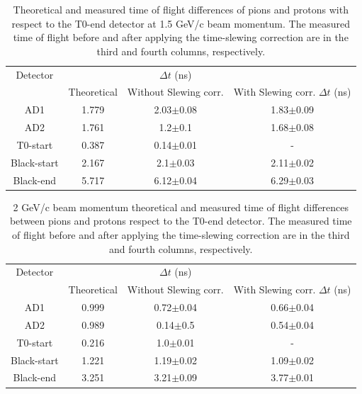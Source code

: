 	\begin{table}[h!]
		\centering
		\caption{
		Theoretical and measured time of flight differences of pions and protons with respect
			to the T0-end detector at 1.5 GeV/c beam momentum. %
			The measured time of flight before and
			after applying the time-slewing correction are in the third and fourth columns, respectively.}
		\begin{tabular}{ | c||c c c| } \hline
			Detector &  &$\Delta t$ (ns) & \\
			& Theoretical & Without Slewing corr. &With Slewing corr. $\Delta t$ (ns) \\ \hline
			
			AD1	    	&1.779	&2.03$\pm$0.08	&1.83$\pm$0.09	\\
			AD2	    	&1.761	&1.2$\pm$0.1	&1.68$\pm$0.08	\\
			T0-start    &0.387	&0.14$\pm$0.01	&-		\\
			Black-start &2.167	&2.1$\pm$0.03	&2.11$\pm$0.02	\\
			Black-end   &5.717	&6.12$\pm$0.04	&6.29$\pm$0.03 	\\ \hline
		\end{tabular}
		\label{table:1p5GeVtimes}
	\end{table}


	
	\begin{table}[h!]
		\centering
		\caption{
		2 GeV/c beam momentum theoretical and measured time of flight differences between pions and protons respect
			to the T0-end detector. The measured time of flight before and
			after applying the time-slewing correction are in the third and fourth columns, respectively.}
		\begin{tabular}{|c||c c c|}\hline
			Detector &  &$\Delta t$ (ns) & \\
			& Theoretical & Without Slewing corr. &With Slewing corr. $\Delta t$ (ns) \\ \hline
			AD1	    	&0.999	&0.72$\pm$0.04	&0.66$\pm$0.04	\\
			AD2	    	&0.989	&0.14$\pm$0.5	&0.54$\pm$0.04	\\
			T0-start    &0.216	&1.0$\pm$0.01	&-		\\
			Black-start &1.221	&1.19$\pm$0.02	&1.09$\pm$0.02	\\
			Black-end   &3.251	&3.21$\pm$0.09	&3.77$\pm$0.01\\ 
			\hline
		\end{tabular}
		\label{table:2GeVtimes}
	\end{table}

